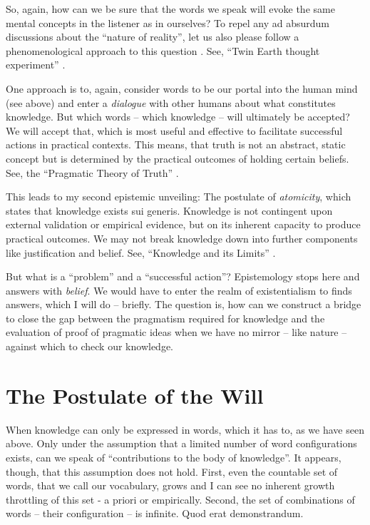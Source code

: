 So, again, how can we be sure that the words we speak will evoke the same mental concepts in the listener as in ourselves?
To repel any ad absurdum discussions about the \enquote{nature of reality}, let us also please follow a phenomenological approach to this question \parencite{husserl-02}.
See, \enquote{Twin Earth thought experiment} \parencite{putnam-73}.

One approach is to, again, consider words to be our portal into the human mind (see above) and enter a \textit{dialogue} with other humans about what constitutes knowledge.
But which words -- which knowledge -- will ultimately be accepted?
We will accept that, which is most useful and effective to facilitate successful actions in practical contexts.
This means, that truth is not an abstract, static concept but is determined by the practical outcomes of holding certain beliefs.
See, the \enquote{Pragmatic Theory of Truth} \parencite{capps-23}.

This leads to my second epistemic unveiling: The postulate of \textit{atomicity}, which states that knowledge exists sui generis.
Knowledge is not contingent upon external validation or empirical evidence, but on its inherent capacity to produce practical outcomes.
We may not break knowledge down into further components like justification and belief.
See, \enquote{Knowledge and its Limits} \parencite{williamson-02}.

But what is a \enquote{problem} and a \enquote{successful action}?
Epistemology stops here and answers with \textit{belief}.
We would have to enter the realm of existentialism to finds answers, which I will do -- briefly.
The question is, how can we construct a bridge to close the gap between the pragmatism required for knowledge and the evaluation of proof of pragmatic ideas when we have no mirror -- like nature -- against which to check our knowledge.


\section{The Postulate of the Will}

When knowledge can only be expressed in words, which it has to, as we have seen above.
Only under the assumption that a limited number of word configurations exists, can we speak of \enquote{contributions to the body of knowledge}.
It appears, though, that this assumption does not hold.
First, even the countable set of words, that we call our vocabulary, grows and I can see no inherent growth throttling of this set - a priori or empirically.
Second, the set of combinations of words -- their configuration -- is infinite.
Quod erat demonstrandum.

